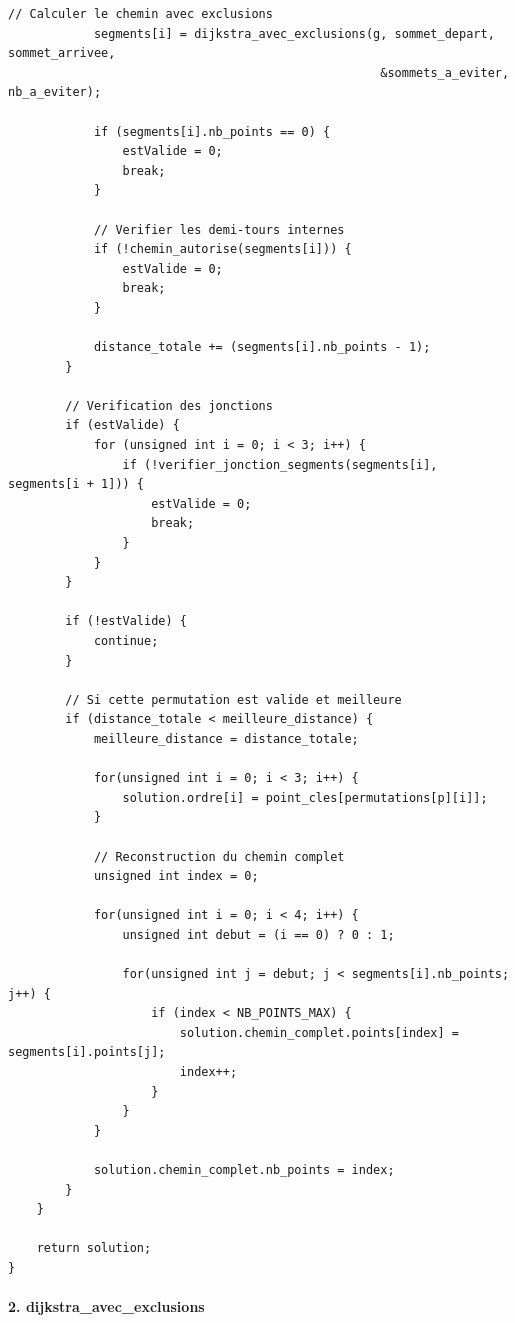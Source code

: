 \documentclass[11pt,a4paper]{article}
\begin{document}
\begin{lstlisting}[caption={Fonction de résolution du chemin optimal}, label=lst:resoudre]
            // Calculer le chemin avec exclusions
            segments[i] = dijkstra_avec_exclusions(g, sommet_depart, sommet_arrivee, 
                                                    &sommets_a_eviter, nb_a_eviter);

            if (segments[i].nb_points == 0) {
                estValide = 0;
                break;
            }

            // Verifier les demi-tours internes
            if (!chemin_autorise(segments[i])) {
                estValide = 0;
                break;
            }

            distance_totale += (segments[i].nb_points - 1);
        }

        // Verification des jonctions
        if (estValide) {
            for (unsigned int i = 0; i < 3; i++) {
                if (!verifier_jonction_segments(segments[i], segments[i + 1])) {
                    estValide = 0;
                    break;
                }
            }
        }

        if (!estValide) {
            continue;
        }

        // Si cette permutation est valide et meilleure
        if (distance_totale < meilleure_distance) {
            meilleure_distance = distance_totale;

            for(unsigned int i = 0; i < 3; i++) {
                solution.ordre[i] = point_cles[permutations[p][i]];
            }

            // Reconstruction du chemin complet
            unsigned int index = 0;
            
            for(unsigned int i = 0; i < 4; i++) {
                unsigned int debut = (i == 0) ? 0 : 1;
                
                for(unsigned int j = debut; j < segments[i].nb_points; j++) {
                    if (index < NB_POINTS_MAX) {
                        solution.chemin_complet.points[index] = segments[i].points[j];
                        index++;
                    }
                }
            }
            
            solution.chemin_complet.nb_points = index;
        } 
    }

    return solution;
}
\end{lstlisting}

\paragraph{2. dijkstra\_avec\_exclusions} \mbox{} \\[5pt]
\end{document}
